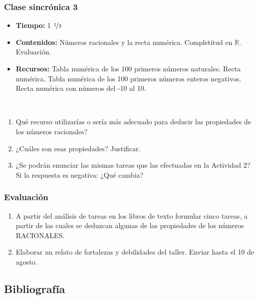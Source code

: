 \subsubsection{Clase sincrónica 3}

\begin{itemize}
	\item \textbf{Tiempo:} 1 $\nicefrac12$
	\item \textbf{Contenidos:} Números racionales y la recta numérica. Completitud en $\mathbb{R}$. Evaluación.
	\item \textbf{Recursos:} Tabla numérica de los 100 primeros números naturales. Recta numérica. Tabla numérica de los 100 primeros números enteros negativos. Recta numérica con números del -10 al 10.
\end{itemize}

\begin{actividad}
	~
	\begin{enumerate}
		\item Qué recurso utilizarías o sería más adecuado para deducir las propiedades de los números racionales?
		\item ¿Cuáles son esas propiedades? Justificar.
		\item ¿Se podrán enunciar las mismas tareas que las efectuadas en la Actividad 2? Si la respuesta es negativa: ¿Qué cambia?
	\end{enumerate}
\end{actividad}

\subsubsection{Evaluación}

\begin{enumerate}
	\item A partir del análisis de tareas en los libros de texto formular cinco tareas, a partir de las cuales se deduzcan algunas de las propiedades de los números RACIONALES.
	\item Elaborar un relato de fortalezas y debilidades del taller. Enviar hasta el 10 de agosto.
\end{enumerate}

\subsection{Bibliografía}

\nocite{*}
\printbibliography[keyword={05}]